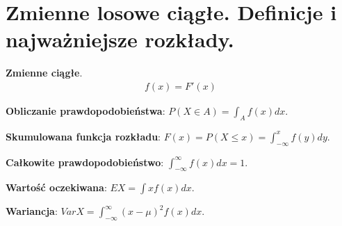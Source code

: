 \documentclass[main.tex]{subfiles}
\begin{document}
    \newpage


    \section{Zmienne losowe ciągłe. Definicje i najważniejsze rozkłady.}

    \begin{definition}
        \textbf{Zmienne ciągłe}.
        \begin{align*}
            f(x) = F'(x)
        \end{align*}

        \textbf{Obliczanie prawdopodobieństwa}: $P(X \in A) = \int_{A} f(x)dx$.

        \textbf{Skumulowana funkcja rozkładu}: $F(x) = P(X \leq x) = \int_{-\infty}^{x}f(y)dy$.

        \textbf{Całkowite prawdopodobieństwo}: $\int_{- \infty}^{\infty}f(x)dx = 1$.

        \textbf{Wartość oczekiwana}: $EX = \int xf(x) dx$.

        \textbf{Wariancja}: $VarX = \int_{- \infty}^{\infty} (x - \mu)^2 f(x) dx$.
    \end{definition}
\end{document}
